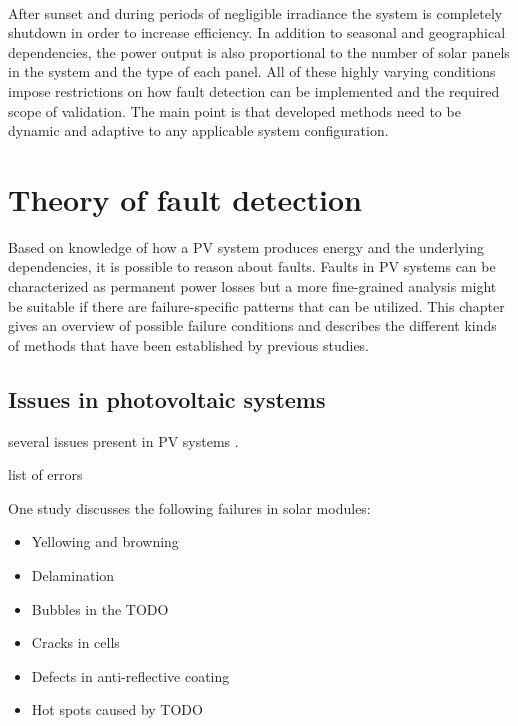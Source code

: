 \begin{figure}[here]
\centering
{}
~
\end{figure}

After sunset and during periods of negligible irradiance the system is completely shutdown in order to increase efficiency.
In addition to seasonal and geographical dependencies, the power output is also proportional to the number of solar panels in the system and the type of each panel.
All of these highly varying conditions impose restrictions on how fault detection can be implemented and the required scope of validation.
The main point is that developed methods need to be dynamic and adaptive to any applicable system configuration.

\chapter{Theory of fault detection}
Based on knowledge of how a PV system produces energy and the underlying dependencies,
it is possible to reason about faults.
Faults in PV systems can be characterized as permanent power losses but a more fine-grained analysis might be suitable if there are failure-specific patterns that can be utilized.
This chapter gives an overview of possible failure conditions and describes the different kinds of methods that have been established by previous studies.


\section{Issues in photovoltaic systems}
several issues present in PV systems \cite{Baltus1997,King2002,Petrone2008}.

list of errors \cite{Stettler2005}

One study \cite{Munoz2011} discusses the following failures in solar modules:
\begin{itemize}
\item Yellowing and browning
\item Delamination
\item Bubbles in the TODO
\item Cracks in cells
\item Defects in anti-reflective coating
\item Hot spots caused by TODO
\end{itemize}

